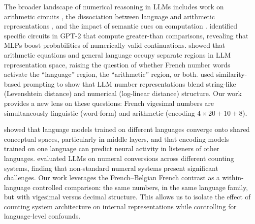 The broader landscape of numerical reasoning in LLMs includes work on arithmetic circuits \citep{hanna2023does}, the dissociation between language and arithmetic representations \citep{kisako2025representational}, and the impact of semantic cues on computation \citep{deleeuw2025semantic}. \citet{hanna2023does} identified specific circuits in GPT-2 that compute greater-than comparisons, revealing that MLPs boost probabilities of numerically valid continuations. \citet{kisako2025representational} showed that arithmetic equations and general language occupy separate regions in LLM representation space, raising the question of whether French number words activate the ``language'' region, the ``arithmetic'' region, or both. \citet{marjieh2025number} used similarity-based prompting to show that LLM number representations blend string-like (Levenshtein distance) and numerical (log-linear distance) structure. Our work provides a new lens on these questions: French vigesimal numbers are simultaneously linguistic (word-form) and arithmetic (encoding $4\times20+10+8$).

\citet{zada2025brains} showed that language models trained on different languages converge onto shared conceptual spaces, particularly in middle layers, and that encoding models trained on one language can predict neural activity in listeners of other languages. \citet{xu2024numcot} evaluated LLMs on numeral conversions across different counting systems, finding that non-standard numeral systems present significant challenges. Our work leverages the French--Belgian French contrast as a within-language controlled comparison: the same numbers, in the same language family, but with vigesimal versus decimal structure. This allows us to isolate the effect of counting system architecture on internal representations while controlling for language-level confounds.
